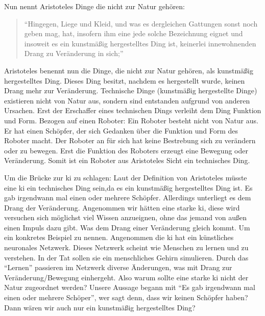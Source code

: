Nun nennt Aristoteles Dinge die nicht zur Natur gehören:
\begin{quote}
	\enquote{Hingegen, Liege und Kleid, und was es dergleichen Gattungen sonst noch geben mag, hat, insofern ihm eine jede solche Bezeichnung eignet und insoweit es ein kunstmäßig hergestelltes Ding ist, keinerlei innewohnenden Drang zu Veränderung in sich;}
	\cite[192b8 ff.]{PhysikII} 
\end{quote}
Aristoteles benennt nun die Dinge, die nicht zur Natur gehören, als kunstmäßig hergestelltes Ding. Dieses Ding besitzt, nachdem es hergestellt wurde, keinen Drang mehr zur Veränderung. Technische Dinge (kunstmäßig hergestellte Dinge) existieren nicht von Natur aus, sondern sind entstanden aufgrund von anderen Ursachen. Erst der Erschaffer eines technischen Dings verleiht dem Ding Funktion und Form. Bezogen auf einen Roboter: Ein Roboter besteht nicht von Natur aus. Er hat einen Schöpfer, der sich Gedanken über die Funktion und Form des Roboter macht. Der Roboter an für sich hat keine Bestrebung sich zu verändern oder zu bewegen. Erst die Funktion des Roboters erzeugt eine Bewegung oder Veränderung. Somit ist ein Roboter aus Aristoteles Sicht ein technisches Ding. 

Um die Brücke zur \ac{ki} zu schlagen: Laut der Definition von Aristoteles müsste eine \ac{ki} ein technisches Ding sein,da es ein kunstmäßig hergestelltes Ding ist. Es gab irgendwann mal einen oder mehrere Schöpfer. Allerdings unterliegt es dem Drang der Veränderung. Angenommen wir hätten eine starke \ac{ki}, diese wird versuchen sich möglichst viel Wissen anzueignen, ohne das jemand von außen einen Impuls dazu gibt. Was dem Drang einer Veränderung gleich kommt. Um ein konkretes Beispiel zu nennen. Angenommen die \ac{ki} hat ein künstliches neuronales Netzwerk. Dieses Netzwerk scheint wie Menschen zu lernen und zu verstehen. In der Tat sollen sie ein menschliches Gehirn simulieren. 
Durch das \enquote{Lernen} passieren im Netzwerk diverse Änderungen, was mit Drang zur Veränderung/Bewegung einhergeht. Also warum sollte eine starke \ac{ki} nicht der Natur zugeordnet werden? Unsere Aussage begann mit \enquote{Es gab irgendwann mal einen oder mehrere Schöper}, wer sagt denn, dass wir keinen Schöpfer haben? Dann wären wir auch nur ein kunstmäßig hergestelltes Ding?


